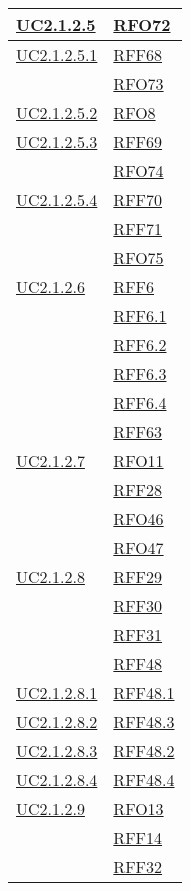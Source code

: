 \begin{longtable}{|>{\centering}m{5cm}|m{5cm}<{\centering}|}
	\hyperlink{UC2.1.2.5}{UC2.1.2.5} & \hyperlink{RFO72}{RFO72}\\ \hline
	\hyperlink{UC2.1.2.5.1}{UC2.1.2.5.1} & \hyperlink{RFF68}{RFF68}\\
	& \hyperlink{RFO73}{RFO73}\\ \hline
	\hyperlink{UC2.1.2.5.2}{UC2.1.2.5.2} & \hyperlink{RFO8}{RFO8}\\ \hline
	\hyperlink{UC2.1.2.5.3}{UC2.1.2.5.3} & \hyperlink{RFF69}{RFF69}\\
	& \hyperlink{RFO74}{RFO74}\\ \hline
	\hyperlink{UC2.1.2.5.4}{UC2.1.2.5.4} & \hyperlink{RFF70}{RFF70}\\
	& \hyperlink{RFF71}{RFF71}\\
	& \hyperlink{RFO75}{RFO75}\\ \hline
	\hyperlink{UC2.1.2.6}{UC2.1.2.6} & \hyperlink{RFF6}{RFF6}\\
	& \hyperlink{RFF6.1}{RFF6.1}\\
	& \hyperlink{RFF6.2}{RFF6.2}\\
	& \hyperlink{RFF6.3}{RFF6.3}\\
	& \hyperlink{RFF6.4}{RFF6.4}\\
	& \hyperlink{RFF63}{RFF63}\\ \hline
	\hyperlink{UC2.1.2.7}{UC2.1.2.7} & \hyperlink{RFO11}{RFO11}\\
	& \hyperlink{RFF28}{RFF28}\\
	& \hyperlink{RFO46}{RFO46}\\
	& \hyperlink{RFO47}{RFO47}\\ \hline
	\hyperlink{UC2.1.2.8}{UC2.1.2.8} & \hyperlink{RFF29}{RFF29}\\
	& \hyperlink{RFF30}{RFF30}\\
	& \hyperlink{RFF31}{RFF31}\\
	& \hyperlink{RFF48}{RFF48}\\ \hline
	\hyperlink{UC2.1.2.8.1}{UC2.1.2.8.1} & \hyperlink{RFF48.1}{RFF48.1}\\ \hline
	\hyperlink{UC2.1.2.8.2}{UC2.1.2.8.2} & \hyperlink{RFF48.3}{RFF48.3}\\ \hline
	\hyperlink{UC2.1.2.8.3}{UC2.1.2.8.3} & \hyperlink{RFF48.2}{RFF48.2}\\ \hline
	\hyperlink{UC2.1.2.8.4}{UC2.1.2.8.4} & \hyperlink{RFF48.4}{RFF48.4}\\ \hline
	\hyperlink{UC2.1.2.9}{UC2.1.2.9} & \hyperlink{RFO13}{RFO13}\\
	& \hyperlink{RFF14}{RFF14}\\
	& \hyperlink{RFF32}{RFF32}\\

\end{longtable}
